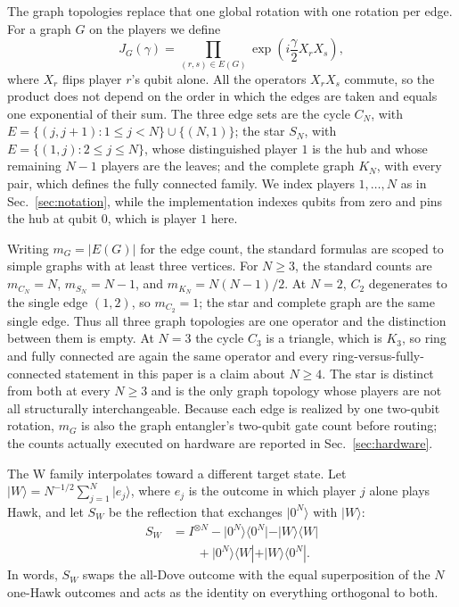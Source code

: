 \documentclass[conference,letterpaper,10pt]{IEEEtran}
\newcommand{\ket}[1]{\ensuremath{|#1\rangle}}
\begin{document}
The graph topologies replace that one global rotation with one rotation per
edge. For a graph $G$ on the players we define
\begin{equation}
J_G(\gamma)
=\prod_{(r,s)\in E(G)}
\exp\!\left(i\frac{\gamma}{2}X_rX_s\right),
\label{eq:graph-entangler}
\end{equation}
where $X_r$ flips player $r$'s qubit alone. All the operators $X_rX_s$ commute,
so the product does not depend on the order in which the edges are taken and
equals one exponential of their sum. The three edge sets are the cycle $C_N$,
with $E=\{(j,j{+}1):1\le j<N\}\cup\{(N,1)\}$; the star $S_N$, with
$E=\{(1,j):2\le j\le N\}$, whose distinguished player $1$ is the hub and whose
remaining $N-1$ players are the leaves; and the complete graph $K_N$, with every
pair, which defines the fully connected family. We index players $1,\ldots,N$ as in Sec.~\ref{sec:notation}, while the
implementation indexes qubits from zero and pins the hub at qubit $0$, which is
player $1$ here.

Writing $m_G=\lvert E(G)\rvert$ for the edge count, the standard formulas are
scoped to simple graphs with at least three vertices.
For $N\ge3$, the standard counts are $m_{C_N}=N$, $m_{S_N}=N-1$, and
$m_{K_N}=N(N-1)/2$.
At $N=2$, $C_2$ degenerates to the single edge $(1,2)$, so $m_{C_2}=1$; the star and
complete graph are the same single edge. Thus all three graph topologies are one
operator and the distinction between them is empty. At $N=3$ the cycle $C_3$ is a triangle, which
is $K_3$, so ring and fully connected are again the same operator and every
ring-versus-fully-connected statement in this paper is a claim about $N\ge4$. The star
is distinct from both at every $N\ge3$ and is the only graph topology whose
players are not all structurally interchangeable. Because each edge is realized
by one two-qubit rotation, $m_G$ is also the graph entangler's two-qubit gate
count before routing; the counts actually executed on hardware are reported in
Sec.~\ref{sec:hardware}.

The W family interpolates toward a different target state. Let
$\ket{W}=N^{-1/2}\sum_{j=1}^{N}\ket{e_j}$, where $e_j$ is the outcome in which
player $j$ alone plays Hawk, and let $S_W$ be the reflection that exchanges
$\ket{0^N}$ with $\ket{W}$:
\begin{equation}
\begin{split}
S_W&=I^{\otimes N}-\ket{0^N}\langle 0^N|-\ket{W}\langle W|\\
&\qquad+\ket{0^N}\langle W|+\ket{W}\langle 0^N|.
\end{split}
\label{eq:w-involution}
\end{equation}
In words, $S_W$ swaps the all-Dove outcome with the equal superposition of the
$N$ one-Hawk outcomes and acts as the identity on everything orthogonal to both.
\end{document}
